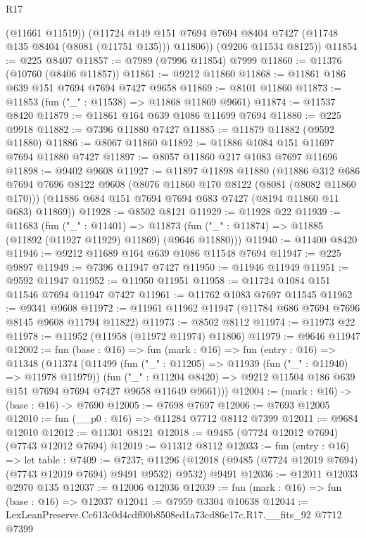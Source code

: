 \begin{lexlean}{R17}
\begin{coremodule}
          (@11661 @11519))
        (@11724 @149 @151 @7694 @7694 @8404 @7427 (@11748 @135 @8404 (@8081 (@11751 @135))) @11806))
      (@9206 @11534 @8125))
@11854 := @225 @8407
@11857 := @7989 (@7996 @11854) @7999
@11860 := @11376 (@10760 (@8406 @11857))
@11861 := @9212 @11860
@11868 := @11861 @186 @639 @151 @7694 @7694 @7427 @9658
@11869 := @8101 @11860
@11873 := @11853 (fun ("_" : @11538) => @11868 @11869 @9661)
@11874 := @11537 @8420
@11879 := @11861 @164 @639 @1086 @11699 @7694
@11880 := @225 @9918
@11882 := @7396 @11880 @7427
@11885 := @11879 @11882 (@9592 @11880)
@11886 := @8067 @11860
@11892 := @11886 @1084 @151 @11697 @7694 @11880 @7427
@11897 := @8057 @11860 @217 @1083 @7697 @11696
@11898 := @9402 @9608
@11927 := @11897
    @11898
    @11880
    (@11886
      @312
      @686
      @7694
      @7696
      @8122
      @9608
      (@8076 @11860 @170 @8122 (@8081 (@8082 @11860 @170)))
      (@11886 @684 @151 @7694 @7694 @683 @7427 (@8194 @11860 @11 @683) @11869))
@11928 := @8502 @8121
@11929 := @11928 @22
@11939 := @11683
    (fun ("_" : @11401) =>
    @11873 (fun ("_" : @11874) => @11885 (@11892 (@11927 @11929) @11869) (@9646 @11880)))
@11940 := @11400 @8420
@11946 := @9212 @11689 @164 @639 @1086 @11548 @7694
@11947 := @225 @9897
@11949 := @7396 @11947 @7427
@11950 := @11946 @11949
@11951 := @9592 @11947
@11952 := @11950 @11951
@11958 := @11724 @1084 @151 @11546 @7694 @11947 @7427
@11961 := @11762 @1083 @7697 @11545
@11962 := @9341 @9608
@11972 := @11961 @11962 @11947 (@11784 @686 @7694 @7696 @8145 @9608 @11794 @11822)
@11973 := @8502 @8112
@11974 := @11973 @22
@11978 := @11952 (@11958 (@11972 @11974) @11806)
@11979 := @9646 @11947
@12002 := fun (base : @16) =>
  fun (mark : @16) =>
  fun (entry : @16) =>
  @11348
    (@11374
      (@11499
        (fun ("_" : @11205) => @11939 (fun ("_" : @11940) => @11978 @11979))
        (fun ("_" : @11204 @8420) =>
        @9212 @11504 @186 @639 @151 @7694 @7694 @7427 @9658 @11649 @9661)))
@12004 := (mark : @16) -> (base : @16) -> @7690
@12005 := @7698 @7697
@12006 := @7693 @12005
@12010 := fun (__p0 : @16) => @11284 @7712 @8112 @7399
@12011 := @9684 @12010
@12012 := @11301 @8121
@12018 := @9485 (@7724 @12012 @7694) (@7743 @12012 @7694)
@12019 := @11312 @8112
@12033 := fun (entry : @16) =>
  let table : @7409 := @7237;
  @11296 (@12018 (@9485 (@7724 @12019 @7694) (@7743 @12019 @7694) @9491 @9532) @9532) @9491
@12036 := @12011 @12033 @2970 @135
@12037 := @12006 @12036
@12039 := fun (mark : @16) => fun (base : @16) => @12037
@12041 := @7959 @3304 @10638
@12044 := LexLeanPreserve.Cc613c0d4cdf00b8508ed1a73cd86e17c.R17.__fits_92 @7712 @7399

\end{coremodule}
\end{lexlean}
